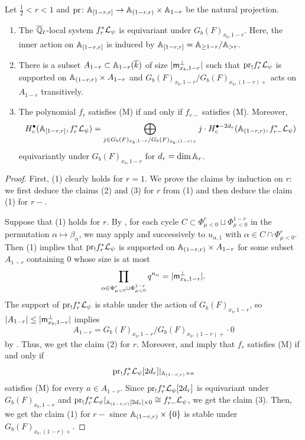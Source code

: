 \documentclass[12pt,reqno]{amsart}
\begin{document}
\begin{prop} \label{prop:induction_principle_n=1}
    Let $\tfrac{1}{2} < r < 1$ and ${\operatorname{pr}} \colon \mathbb{A}_{[1-r, r]} \to \mathbb{A}_{(1-r, r)} \times \mathbb{A}_{1-r}$ be the natural projection. 
    \begin{enumerate}
        \item The ${\overline{\mathbb{Q}}_\ell}$-local system $f_r^*{\mathcal{L}}_\psi$ is equivariant under $G_b(F)_{x_b, 1-r}$. Here, the inner action on $\mathbb{A}_{[1-r, r]}$ is induced by $\mathbb{A}_{[1-r, r]} = \mathbb{A}_{\geq 1 - r} / \mathbb{A}_{> r}$. 
        \item There is a subset $A_{1-r} \subset \mathbb{A}_{1-r}({\overline{k}})$ of size $\lvert {\mathsf{m}}_{x_b, 1-r}^\perp \rvert$ such that ${\operatorname{pr}}_! f_r^* {\mathcal{L}}_\psi$ is supported on $\mathbb{A}_{(1-r, r)} \times A_{1-r}$ and $G_b(F)_{x_b, 1 - r} / G_b(F)_{x_b, (1-r)+}$ acts on $A_{1-r}$ transitively. 
        \item The polynomial $f_r$ satisfies (M) if and only if $f_{r-}$ satisfies (M). Moreover, 
        \[
            H_c^\bullet (\mathbb{A}_{[1-r, r]}, f_r^* {\mathcal{L}}_\psi) = \bigoplus_{j \in G_b(F)_{x_b, 1 - r} / G_b(F)_{x_b, (1-r)+}} j \cdot H_c^{\bullet - 2d_r} (\mathbb{A}_{(1-r, r)}, f_{r-}^* {\mathcal{L}}_\psi)
        \]
        equivariantly under $G_b(F)_{x_b, 1 - r}$ for $d_r = \dim \mathbb{A}_r$. 
    \end{enumerate}
\end{prop}
\begin{proof}
    First, (1) clearly holds for $r = 1$. We prove the claims by induction on $r$: we first deduce the claims (2) and (3) for $r$ from (1) and then deduce the claim (1) for $r-$. 
    
    Suppose that (1) holds for $r$. By , for each cycle $C \subset \Phi_{\mu < 0}^r \sqcup \Phi_{\mu < 0}^{1 - r}$ in the permutation $\alpha \mapsto \beta_\alpha$, we may apply  and  successively to $u_{\alpha, 1}$ with $\alpha \in C \cap \Phi^{r}_{\mu < 0}$. Then  (1) implies that ${\operatorname{pr}}_! f_r^* {\mathcal{L}}_\psi$ is supported on $\mathbb{A}_{(1-r, r)} \times A_{1-r}$ for some subset $A_{1 - r}$ containing $0$ whose size is at most 
    \[
        \prod_{\alpha \in \Phi_{\mu < 0}^{r} \sqcup \Phi_{\mu < 0}^{1 - r}} q^{n_\alpha} = \lvert {\mathsf{m}}_{x_b, 1 - r}^\perp \rvert. 
    \]
    The support of ${\operatorname{pr}}_! f_r^* {\mathcal{L}}_\psi$ is stable under the action of $G_b(F)_{x_b, 1 - r}$, so $\lvert A_{1-r} \rvert \leq  \lvert {\mathsf{m}}_{x_b, 1 - r}^\perp \rvert$ implies
    \[
        A_{1 - r} = G_b(F)_{x_b, 1-r} / G_b(F)_{x_b,(1-r)+} \cdot 0
    \]
    by . Thus, we get the claim (2) for $r$. Moreover,  and  imply that $f_r$ satisfies (M) if and only if 
    \[
        {\operatorname{pr}}_! f_r^* {\mathcal{L}}_\psi [2d_r] \vert_{\mathbb{A}_{(1-r, r)} \times a}
    \]
    satisfies (M) for every $a \in A_{1-r}$. Since $ {\operatorname{pr}}_! f_r^* {\mathcal{L}}_\psi [2d_r]$ is equivariant under $G_b(F)_{x_b, 1-r}$ and ${\operatorname{pr}}_! f_r^* {\mathcal{L}}_\psi\vert_{\mathbb{A}_{(1-r, r)}[2d_r] \times 0} \cong f_{r-}^* {\mathcal{L}}_\psi$, we get the claim (3). Then, we get the claim (1) for $r-$ since $\mathbb{A}_{(1-r, r)} \times \{0\}$ is stable under $G_b(F)_{x_b, (1-r)+}$. 
\end{proof}
\end{document}
